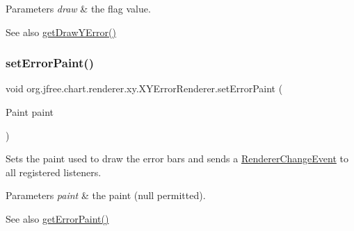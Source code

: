 \begin{DoxyParams}{Parameters}
{\em draw} & the flag value.\\
\hline
\end{DoxyParams}
\begin{DoxySeeAlso}{See also}
\mbox{\hyperlink{classorg_1_1jfree_1_1chart_1_1renderer_1_1xy_1_1_x_y_error_renderer_a5c8f1a7133334d269616167fa9600e99}{get\+Draw\+Y\+Error()}} 
\end{DoxySeeAlso}
\mbox{\label{classorg_1_1jfree_1_1chart_1_1renderer_1_1xy_1_1_x_y_error_renderer_a561701d3462cbba2ef397c7d8248b4c5}} 
\subsubsection{\texorpdfstring{set\+Error\+Paint()}{setErrorPaint()}}
{\footnotesize\ttfamily void org.\+jfree.\+chart.\+renderer.\+xy.\+X\+Y\+Error\+Renderer.\+set\+Error\+Paint (\begin{DoxyParamCaption}\item[{Paint}]{paint }\end{DoxyParamCaption})}

Sets the paint used to draw the error bars and sends a \mbox{\hyperlink{}{Renderer\+Change\+Event}} to all registered listeners.


\begin{DoxyParams}{Parameters}
{\em paint} & the paint ({\ttfamily null} permitted).\\
\hline
\end{DoxyParams}
\begin{DoxySeeAlso}{See also}
\mbox{\hyperlink{classorg_1_1jfree_1_1chart_1_1renderer_1_1xy_1_1_x_y_error_renderer_aa366f33967304e07b792820fef8b3333}{get\+Error\+Paint()}} 
\end{DoxySeeAlso}
\mbox{\label{classorg_1_1jfree_1_1chart_1_1renderer_1_1xy_1_1_x_y_error_renderer_a29583e5b484669781822928997ccced5}} 
